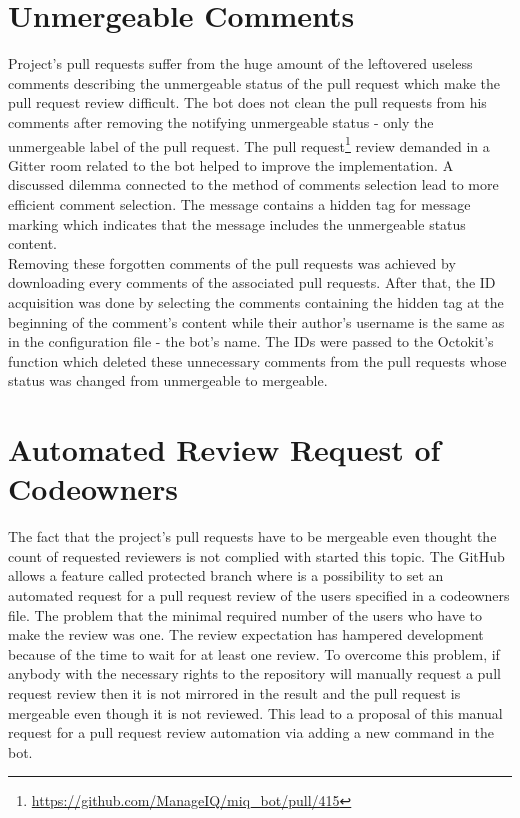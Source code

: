 \section{Unmergeable Comments}

Project's pull requests suffer from the huge amount of the leftovered useless comments describing the unmergeable status of the pull request which make the pull request review difficult. The bot does not clean the pull requests from his comments after removing the notifying unmergeable status - only the unmergeable label of the pull request. The pull request\footnote{\url{https://github.com/ManageIQ/miq_bot/pull/415}} review demanded in a Gitter room related to the bot helped to improve the implementation. A discussed dilemma connected to the method of comments selection lead to more efficient comment selection. The message contains a hidden tag for message marking which indicates that the message includes the unmergeable status content.\\

Removing these forgotten comments of the pull requests was achieved by downloading every comments of the associated pull requests. After that, the ID acquisition was done by selecting the comments containing the hidden tag at the beginning of the comment's content while their author's username is the same as in the configuration file - the bot's name. The IDs were passed to the Octokit's function which deleted these unnecessary comments from the pull requests whose status was changed from unmergeable to mergeable.

\section{Automated Review Request of Codeowners}

The fact that the project's pull requests have to be mergeable even thought the count of requested reviewers is not complied with started this topic. The GitHub allows a feature called protected branch where is a possibility to set an automated request for a pull request review of the users specified in a codeowners file. The problem that the minimal required number of the users who have to make the review was one. The review expectation has hampered development because of the time to wait for at least one review. To overcome this problem, if anybody with the necessary rights to the repository will manually request a pull request review then it is not mirrored in the result and the pull request is mergeable even though it is not reviewed. This lead to a proposal of this manual request for a pull request review automation via adding a new command in the bot.

